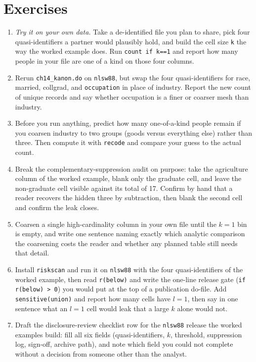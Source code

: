 \documentclass[
    a4paper,
    fontsize=10pt,
    twoside=true,
    numbers=noenddot,
]{kaobook}
\begin{document}
\section*{Exercises}
\begin{enumerate}
\item \emph{Try it on your own data.} Take a de-identified file you plan to share, pick four quasi-identifiers a partner would plausibly hold, and build the cell size \texttt{k} the way the worked example does. Run \texttt{count if k==1} and report how many people in your file are one of a kind on those four columns.
\item Rerun \texttt{ch14\_kanon.do} on \texttt{nlsw88}, but swap the four quasi-identifiers for race, married, collgrad, and \texttt{occupation} in place of industry. Report the new count of unique records and say whether occupation is a finer or coarser mesh than industry.
\item Before you run anything, predict how many one-of-a-kind people remain if you coarsen industry to two groups (goods versus everything else) rather than three. Then compute it with \texttt{recode} and compare your guess to the actual count.
\item Break the complementary-suppression audit on purpose: take the agriculture column of the worked example, blank only the graduate cell, and leave the non-graduate cell visible against its total of 17. Confirm by hand that a reader recovers the hidden three by subtraction, then blank the second cell and confirm the leak closes.
\item Coarsen a single high-cardinality column in your own file until the $k=1$ bin is empty, and write one sentence naming exactly which analytic comparison the coarsening costs the reader and whether any planned table still needs that detail.
\item Install \texttt{riskscan} and run it on \texttt{nlsw88} with the four quasi-identifiers of the worked example, then read \texttt{r(below)} and write the one-line release gate (\texttt{if r(below) > 0}) you would put at the top of a publication do-file. Add \texttt{sensitive(union)} and report how many cells have $l=1$, then say in one sentence what an $l=1$ cell would leak that a large $k$ alone would not.
\item Draft the disclosure-review checklist row for the \texttt{nlsw88} release the worked examples build: fill all six fields (quasi-identifiers, $k$, threshold, suppression log, sign-off, archive path), and note which field you could not complete without a decision from someone other than the analyst.
\end{enumerate}
\end{document}

